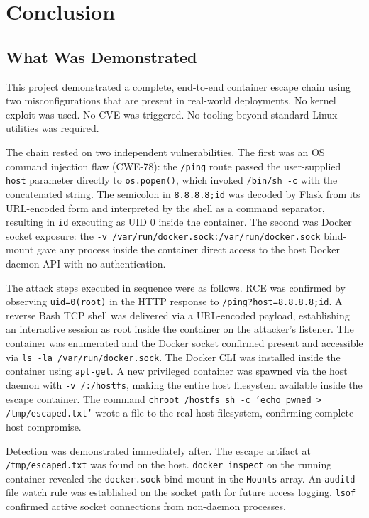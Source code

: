 \chapter{Conclusion}

\section{What Was Demonstrated}

This project demonstrated a complete, end-to-end container escape chain using two misconfigurations that are present in real-world deployments. No kernel exploit was used. No CVE was triggered. No tooling beyond standard Linux utilities was required.

The chain rested on two independent vulnerabilities. The first was an OS command injection flaw (CWE-78): the \texttt{/ping} route passed the user-supplied \texttt{host} parameter directly to \texttt{os.popen()}, which invoked \texttt{/bin/sh -c} with the concatenated string. The semicolon in \texttt{8.8.8.8;id} was decoded by Flask from its URL-encoded form and interpreted by the shell as a command separator, resulting in \texttt{id} executing as UID 0 inside the container. The second was Docker socket exposure: the \texttt{-v /var/run/docker.sock:/var/run/docker.sock} bind-mount gave any process inside the container direct access to the host Docker daemon API with no authentication.

The attack steps executed in sequence were as follows. RCE was confirmed by observing \texttt{uid=0(root)} in the HTTP response to \texttt{/ping?host=8.8.8.8;id}. A reverse Bash TCP shell was delivered via a URL-encoded payload, establishing an interactive session as root inside the container on the attacker's listener. The container was enumerated and the Docker socket confirmed present and accessible via \texttt{ls -la /var/run/docker.sock}. The Docker CLI was installed inside the container using \texttt{apt-get}. A new privileged container was spawned via the host daemon with \texttt{-v /:/hostfs}, making the entire host filesystem available inside the escape container. The command \texttt{chroot /hostfs sh -c 'echo pwned > /tmp/escaped.txt'} wrote a file to the real host filesystem, confirming complete host compromise.

Detection was demonstrated immediately after. The escape artifact at \texttt{/tmp/escaped.txt} was found on the host. \texttt{docker inspect} on the running container revealed the \texttt{docker.sock} bind-mount in the \texttt{Mounts} array. An \texttt{auditd} file watch rule was established on the socket path for future access logging. \texttt{lsof} confirmed active socket connections from non-daemon processes.

